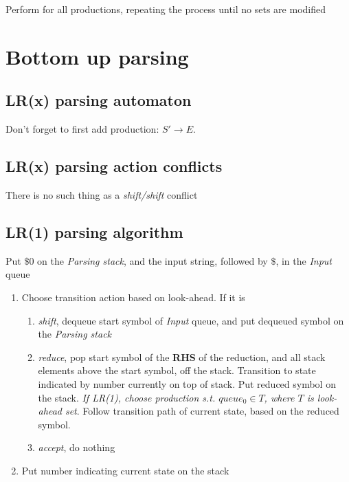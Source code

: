 \documentclass[fontsize=10pt,a4paper]{article}
\begin{document}
\begin{multicols}{3}
    Perform for all productions, repeating the process until no sets are modified

    \section{Bottom up parsing}

    \subsection{LR(x) parsing automaton}

    Don't forget to first add production: $S' \rightarrow E$.

    \subsection{LR(x) parsing action conflicts}

    There is no such thing as a \textit{shift/shift} conflict


    \subsection{LR(1) parsing algorithm}

    Put $\$0$ on the \textit{Parsing stack}, and the input string, followed by $\$$, in the \textit{Input} queue

    \begin{enumerate}
        \item Choose transition action based on look-ahead. If it is
        \begin{enumerate}
            \item \textit{shift}, dequeue start symbol of \textit{Input} queue, and put dequeued symbol on the \textit{Parsing stack}
            \item \textit{reduce}, pop start symbol of the \textbf{RHS} of the reduction, and all stack elements above the start symbol, off the stack. Transition to state indicated by number currently on top of stack. Put reduced symbol on the stack. \textit{If LR(1), choose production s.t. $queue_0 \in T$, where $T$ is look-ahead set}. Follow transition path of current state, based on the reduced symbol.
            \item \textit{accept}, do nothing
        \end{enumerate} 
        \item Put number indicating current state on the stack


\end{enumerate}
\end{multicols}
\end{document}
